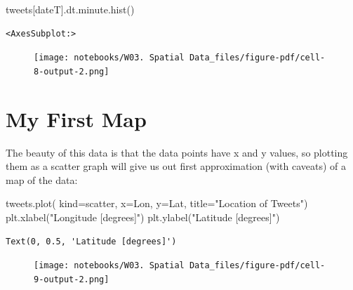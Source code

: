 \documentclass[
  letterpaper,
  DIV=11,
  numbers=noendperiod]{scrreprt}
\newenvironment{Shaded}{\begin{snugshade}}{\end{snugshade}}
\newcommand{\NormalTok}[1]{\textcolor[rgb]{0.00,0.23,0.31}{#1}}
\newcommand{\OperatorTok}[1]{\textcolor[rgb]{0.37,0.37,0.37}{#1}}
\newcommand{\StringTok}[1]{\textcolor[rgb]{0.13,0.47,0.30}{#1}}
\begin{document}
\begin{Shaded}
\begin{Highlighting}[]
\NormalTok{tweets[}\StringTok{\textquotesingle{}dateT\textquotesingle{}}\NormalTok{].dt.minute.hist()}
\end{Highlighting}
\end{Shaded}

\begin{verbatim}
<AxesSubplot:>
\end{verbatim}

\begin{figure}[H]

{\centering \texttt{[image: notebooks/W03. Spatial Data\_files/figure-pdf/cell-8-output-2.png]}

}

\end{figure}

\hypertarget{my-first-map}{%
\section{My First Map}\label{my-first-map}}

The beauty of this data is that the data points have x and y values, so
plotting them as a scatter graph will give us out first approximation
(with caveats) of a map of the data:

\begin{Shaded}
\begin{Highlighting}[]
\NormalTok{tweets.plot(}
\NormalTok{    kind}\OperatorTok{=}\StringTok{\textquotesingle{}scatter\textquotesingle{}}\NormalTok{,}
\NormalTok{    x}\OperatorTok{=}\StringTok{\textquotesingle{}Lon\textquotesingle{}}\NormalTok{,}
\NormalTok{    y}\OperatorTok{=}\StringTok{\textquotesingle{}Lat\textquotesingle{}}\NormalTok{,}
\NormalTok{    title}\OperatorTok{=}\StringTok{"Location of Tweets"}\NormalTok{)}
\NormalTok{plt.xlabel(}\StringTok{"Longitude [degrees]"}\NormalTok{)}
\NormalTok{plt.ylabel(}\StringTok{"Latitude [degrees]"}\NormalTok{)}
\end{Highlighting}
\end{Shaded}

\begin{verbatim}
Text(0, 0.5, 'Latitude [degrees]')
\end{verbatim}

\begin{figure}[H]

{\centering \texttt{[image: notebooks/W03. Spatial Data\_files/figure-pdf/cell-9-output-2.png]}

}

\end{figure}
\end{document}
